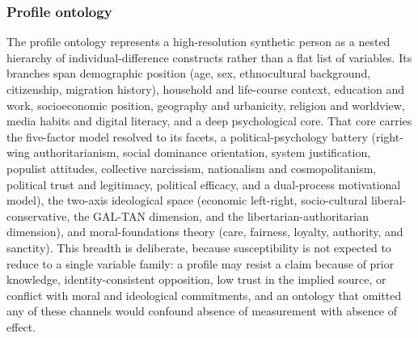 \documentclass[11pt,a4paper]{article}
\begin{document}
\subsubsection{Profile ontology}

The profile ontology represents a high-resolution synthetic person as a nested hierarchy of
individual-difference constructs rather than a flat list of variables. Its branches span
demographic position (age, sex, ethnocultural background, citizenship, migration history),
household and life-course context, education and work, socioeconomic position, geography and
urbanicity, religion and worldview, media habits and digital literacy, and a deep psychological
core. That core carries the five-factor model resolved to its facets, a political-psychology
battery (right-wing authoritarianism, social dominance orientation, system justification,
populist attitudes, collective narcissism, nationalism and cosmopolitanism, political trust and
legitimacy, political efficacy, and a dual-process motivational model), the two-axis ideological
space (economic left-right, socio-cultural liberal-conservative, the GAL-TAN dimension, and the
libertarian-authoritarian dimension), and moral-foundations theory (care, fairness, loyalty,
authority, and sanctity). This breadth is deliberate, because susceptibility is not expected to
reduce to a single variable family: a profile may resist a claim because of prior knowledge,
identity-consistent opposition, low trust in the implied source, or conflict with moral and
ideological commitments, and an ontology that omitted any of these channels would confound
absence of measurement with absence of effect.
\end{document}

